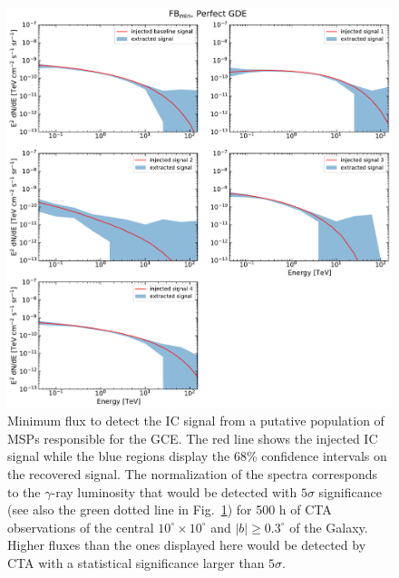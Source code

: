 \documentclass[doublespace,draft,nopageskip]{VTthesis} %
\begin{document}
\begin{figure}
\begin{center}
{    }\label{fig:Injection_perfectGDE}
    \end{center}
\end{figure}

\begin{figure}
    \begin{center}
    \includegraphics[scale = 0.48]{Figures/CTA/all-signal-spectra-mis-False-Fermi-min-True.pdf}
    \caption{Minimum flux to detect the IC signal from a putative population of MSPs responsible for the GCE. The red line shows the injected IC signal while the blue regions display the 68\% confidence intervals on the recovered signal. The normalization of the spectra corresponds to the $\gamma$-ray luminosity that would be detected with $5\sigma$ significance (see also the green dotted line in Fig.~\ref{fig:Injection_perfectGDE}) for 500 h of CTA observations of the central $10^\circ\times10^\circ$ and $|b|\geq0.3^\circ$ of the Galaxy. Higher fluxes than the ones displayed here would be detected by CTA with a statistical significance larger than $5\sigma$.      }\label{fig:RecoveredSpectrum_perfectGDEFBmin}
    \end{center}
\end{figure}
\end{document}
